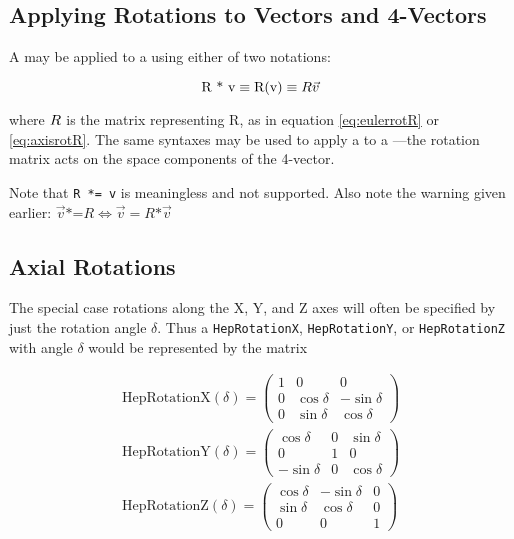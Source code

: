 \subsection{Applying Rotations to Vectors and 4-Vectors}

A \Ro may be applied to a \SV using either of two notations:  

\begin{equation}
\label{eq:Rv}
\mbox{R * v} \equiv \mbox{R(v)} \equiv {\boldmath R} \vec{v}
\end{equation}

\noindent
where ${\boldmath R}$ is the matrix representing R, as in equation
\ref{eq:eulerrotR} or \ref{eq:axisrotR}.  The same syntaxes may be
used to apply a \Ro to a \LV ---the rotation matrix acts on the space
components of the 4-vector.

Note that {\tt R *= v} is meaningless and not supported.  
Also note the warning given earlier:
$ \vec{v} \mbox{*=} R \Longleftrightarrow \vec{v} = R \mbox{*} \vec{v} $

\subsection{Axial Rotations}

The special case rotations along the X, Y, and Z axes will often be specified
by just the rotation angle $\delta$.  Thus a 
{\tt HepRotationX}, {\tt HepRotationY}, or {\tt HepRotationZ}
with angle $\delta$ would be represented by the matrix

\begin{eqnarray}
  \label{eq:rotx}
  \mbox{HepRotationX}(\delta) =
\left(
\begin{array}{ccc}
 1 & 0 & 0 \\
 0 & \cos \delta & - \sin \delta \\
 0 & \sin \delta & \cos \delta 
\end{array}
\right) \\
  \label{eq:roty}
  \mbox{HepRotationY}(\delta) =
\left(
\begin{array}{ccc}
 \cos \delta & 0 & \sin \delta \\
 0 & 1 & 0 \\
 - \sin \delta & 0 & \cos \delta 
\end{array}
\right) \\
  \label{eq:rotz}
  \mbox{HepRotationZ}(\delta) =
\left(
\begin{array}{ccc}
 \cos \delta & - \sin \delta & 0 \\
 \sin \delta & \cos \delta & 0 \\
 0 & 0 & 1
\end{array}
\right) \\
\end{eqnarray}

